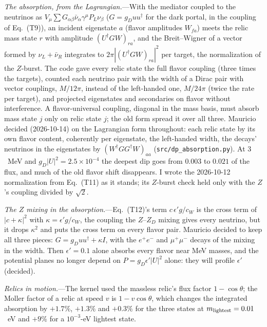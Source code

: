 \documentclass[11pt,a4paper]{article}
\newcommand{\file}[1]{\nolinkurl{#1}}
\newcommand{\gd}{g_D}
\newcommand{\epsp}{\epsilon'}
\begin{document}
\textit{The absorption, from the Lagrangian.}---With the mediator coupled to the neutrinos as
$V_\mu\sum G_{\alpha\beta}\bar\nu_\alpha\gamma^\mu P_L\nu_\beta$ ($G = g_D uu^\dagger$ for the dark portal, in
the coupling of Eq.~(T9)), an incident eigenstate $a$ (flavor amplitudes $W_{fa}$) meets the relic mass
state $r$ with amplitude $(U^\dagger GW)_{ra}$, and the Breit--Wigner of a vector formed by
$\nu_L+\bar\nu_R$ integrates to $2\pi|(U^\dagger GW)_{ra}|^2$ per target, the normalization of the
$Z$-burst. The code gave every relic state the full flavor coupling (three times the targets), counted each
neutrino pair with the width of a Dirac pair with vector couplings, $M/12\pi$, instead of the left-handed
one, $M/24\pi$ (twice the rate per target), and projected eigenstates and secondaries on flavor without
interference. A flavor-universal coupling, diagonal in the mass basis, must absorb mass state $j$ only on
relic state $j$; the old form spread it over all three. Mauricio decided (2026-10-14) on the Lagrangian form
throughout: each relic state by its own flavor content, coherently per eigenstate, the left-handed width,
the decays' neutrinos in the eigenstates by $(W^\dagger GG^\dagger W)_{aa}$
(\file{src/dp_absorption.py}). At $3$~MeV and $g_D|U|^2 = 2.5\times10^{-4}$ the deepest dip goes from
$0.003$ to $0.021$ of the flux, and much of the old flavor shift disappears. I wrote the 2026-10-12
normalization from Eq.~(T11) as it stands; its $Z$-burst check held only with the $Z$'s coupling divided by
$\sqrt2$.

\textit{The $Z$ mixing in the absorption.}---Eq.~(T12)'s term $c\,\epsp g/c_W$ is the cross term of
$|c+\kappa|^2$ with $\kappa = \epsp g/c_W$, the coupling the $Z$--$Z_D$ mixing gives every neutrino, but it
drops $\kappa^2$ and puts the cross term on every flavor pair. Mauricio decided to keep all three pieces:
$G = g_Duu^\dagger + \kappa I$, with the $e^+e^-$ and $\mu^+\mu^-$ decays of the mixing in the width. Then
$\epsp = 0.1$ alone absorbs every flavor near MeV masses, and the potential planes no longer depend on
$P = \gd\epsp|U|^2$ alone: they will profile $\epsp$ (decided).

\textit{Relics in motion.}---The kernel used the massless relic's flux factor $1-\cos\theta$; the Moller
factor of a relic at speed $v$ is $1-v\cos\theta$, which changes the integrated absorption by $+1.7\%$,
$+1.3\%$ and $+0.3\%$ for the three states at $m_{\rm lightest} = 0.01$~eV and $+9\%$ for a $10^{-3}$-eV
lightest state.
\end{document}
